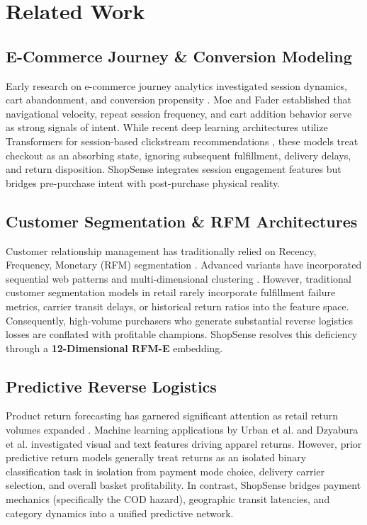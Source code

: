 \documentclass[conference]{IEEEtran}
\begin{document}
\section{Related Work}

\subsection{E-Commerce Journey \& Conversion Modeling}
Early research on e-commerce journey analytics investigated session dynamics, cart abandonment, and conversion propensity \cite{moe2003buying, liu2020predicting}. Moe and Fader \cite{moe2004dynamic} established that navigational velocity, repeat session frequency, and cart addition behavior serve as strong signals of intent. While recent deep learning architectures utilize Transformers for session-based clickstream recommendations \cite{hidasi2016session}, these models treat checkout as an absorbing state, ignoring subsequent fulfillment, delivery delays, and return disposition. ShopSense integrates session engagement features but bridges pre-purchase intent with post-purchase physical reality.

\subsection{Customer Segmentation \& RFM Architectures}
Customer relationship management has traditionally relied on Recency, Frequency, Monetary (RFM) segmentation \cite{hughes1994strategic}. Advanced variants have incorporated sequential web patterns \cite{chen2009discovering} and multi-dimensional clustering \cite{birant2011data}. However, traditional customer segmentation models in retail rarely incorporate fulfillment failure metrics, carrier transit delays, or historical return ratios into the feature space. Consequently, high-volume purchasers who generate substantial reverse logistics losses are conflated with profitable champions. ShopSense resolves this deficiency through a \textbf{12-Dimensional RFM-E} embedding.

\subsection{Predictive Reverse Logistics}
Product return forecasting has garnered significant attention as retail return volumes expanded \cite{min2006genetic, ferguson2006supply}. Machine learning applications by Urban et al. \cite{urban2022predicting} and Dzyabura et al. \cite{dzyabura2023predicting} investigated visual and text features driving apparel returns. However, prior predictive return models generally treat returns as an isolated binary classification task in isolation from payment mode choice, delivery carrier selection, and overall basket profitability. In contrast, ShopSense bridges payment mechanics (specifically the COD hazard), geographic transit latencies, and category dynamics into a unified predictive network.
\end{document}
